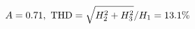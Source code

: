 \documentclass[preview]{standalone}
\begin{document}
\begin{align*}
\special{dvisvgm:raw <g id='unique000'>}A=0.71,\ \text{THD}=\sqrt{H_2^2+H_3^2}/H_1=13.1\%\special{dvisvgm:raw </g>}
\end{align*}
\end{document}

